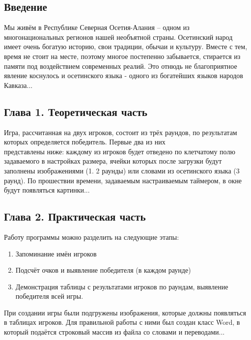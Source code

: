 \documentclass[14pt, a4paper]{extarticle}
\begin{document}
\newpage
\setcounter{subsection}{0}
\setcounter{equation}{0}
\setcounter{section}{0}
\begin{center}
\section*{Введение}
\end{center}
\par Мы живём в Республике Северная Осетия-Алания – одном из \\ многонациональных регионов нашей необъятной страны. Осетинский народ имеет очень богатую историю, свои традиции, обычаи и культуру. Вместе с тем, время не стоит на месте, поэтому многое постепенно забывается, стирается из памяти под воздействием современных реалий. Это отнюдь не благоприятное явление коснулось и осетинского языка - одного из богатейших языков народов Кавказа...
\newpage
\setcounter{subsection}{0}
\setcounter{equation}{0}
\setcounter{section}{0}

\begin{center}
\section*{Глава 1. Теоретическая часть}
\end{center}
\par Игра, рассчитанная на двух игроков, состоит из трёх раундов, по результатам которых определяется победитель. Первые два из них \\представлены ниже: каждому из игроков будет отведено по клетчатому полю задаваемого в настройках размера, ячейки которых после загрузки будут заполнены изображениями (1. 2 раунды) или словами из осетинского языка (3 раунд). По прошествии времени, задаваемым настраиваемым таймером, в окне будут появляться картинки...
\newpage
\setcounter{subsection}{0}
\setcounter{equation}{0}
\setcounter{section}{0}

\begin{center}
\section*{Глава 2. Практическая часть}
\end{center}
\par Работу программы можно разделить на следующие этапы: 
\begin{enumerate}
    \item Запоминание имён игроков 
    \item Подсчёт очков и выявление победителя (в каждом раунде) 
    \item Демонстрация таблицы с результатами игроков по раундам, выявление победителя всей игры. 
\end{enumerate}
\par При создании игры были подгружены изображения, которые должны появляться в таблицах игроков. Для правильной работы с ними был создан класс Word, в который подаётся строковый массив из файла со словами и переводами...
\newpage
\setcounter{subsection}{0}
\setcounter{equation}{0}
\setcounter{section}{0}
\end{document}
